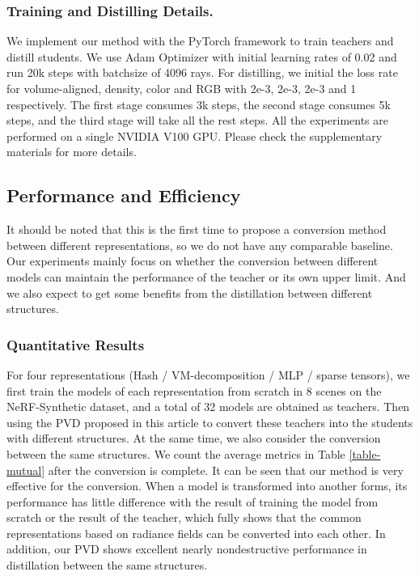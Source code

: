 \documentclass[letterpaper]{article} \usepackage{aaai23}  \usepackage{times}  \usepackage{helvet}  \usepackage{courier}  \usepackage[hyphens]{url}  \usepackage{graphicx} \urlstyle{rm} \def\UrlFont{\rm}  \usepackage{natbib}  \usepackage{caption} \frenchspacing  \setlength{\pdfpagewidth}{8.5in}  \setlength{\pdfpageheight}{11in}  \usepackage{multirow}
\begin{document}
\subsubsection{Training and Distilling Details.} We implement our method with the PyTorch framework \cite{paszke2019pytorch} to train teachers and distill students. We use Adam Optimizer \cite{kingma2014adam} with initial learning rates of 0.02 and run 20k steps with batchsize of 4096 rays. For distilling, we initial the loss rate for volume-aligned, density, color and RGB with 2e-3, 2e-3, 2e-3 and 1 respectively. The first stage consumes 3k steps, the second stage consumes 5k steps, and the third stage will take all the rest steps. All the experiments are performed on a single NVIDIA V100 GPU. 
Please check the supplementary materials for more details.


\subsection{Performance and Efficiency}
It should be noted that this is the first time to propose a conversion method between different representations, so we do not have any comparable baseline. Our experiments mainly focus on whether the conversion between different models can maintain the performance of the teacher or its own upper limit. And we also expect to get some benefits from the distillation between different structures.

\subsubsection{Quantitative Results}
For four representations (Hash / VM-decomposition / MLP / sparse tensors), we first train the models of each representation from scratch in 8 scenes on the NeRF-Synthetic dataset, and a total of 32 models are obtained as teachers. Then using the PVD proposed in this article to convert these teachers into the students with different structures. At the same time, we also consider the conversion between the same structures. We count the average metrics in Table \ref{table-mutual} after the conversion is complete. It can be seen that our method is very effective for the conversion. When a model is transformed into another forms, its performance has little difference with the result of training the model from scratch or the result of the teacher, which fully shows that the common representations based on radiance fields can be converted into each other. In addition, our PVD shows excellent nearly nondestructive performance in distillation between the same structures.
\end{document}
